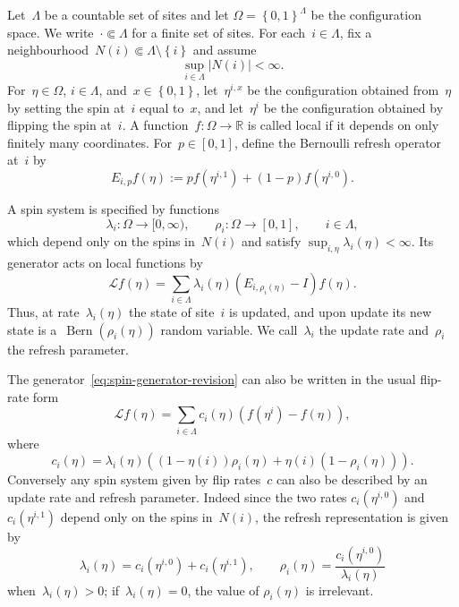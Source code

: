 \documentclass[EJP,preprint,NODS,nobera]{ejpecp}
\newcommand{\R}{\mathbb{R}}
\newcommand{\bb}[1]{\left(#1\right)}
\newcommand{\cb}[1]{\left\{#1\right\}}
\newcommand{\abs}[1]{\left|#1\right|}
\newcommand{\Lcal}{\mathcal{L}}
\begin{document}
Let~$\Lambda$ be a countable set of sites and let
$\Omega=\cb{0,1}^{\Lambda}$ be the configuration space. We write~$\cdot \Subset \Lambda$ for a finite set of sites. For each~$i\in\Lambda$,
fix a  neighbourhood~$N(i)\Subset\Lambda\setminus\cb{i}$ and assume
\begin{equation*}
\sup_{i\in\Lambda}\abs{N(i)}<\infty.
\end{equation*}
For~$\eta\in\Omega$, $i\in\Lambda$, and~$x\in\cb{0,1}$,
let~$\eta^{i,x}$ be the configuration obtained from~$\eta$ by setting the spin
at~$i$ equal to~$x$, and let~$\eta^i$ be the configuration obtained by flipping
the spin at~$i$. A function~$f:\Omega\to\R$ is called local if it depends on only finitely many
coordinates. For~$p\in[0,1]$, define the Bernoulli refresh operator at~$i$ by
\begin{equation*}
E_{i,p}f(\eta)
:=
pf(\eta^{i,1})+(1-p)f(\eta^{i,0}).
\end{equation*}

\begin{definition}
A spin system is specified by functions
\begin{equation*}
\lambda_i:\Omega\to[0,\infty),
\qquad
\rho_i:\Omega\to[0,1],
\qquad i\in\Lambda,
\end{equation*}
which depend only on the spins in~$N(i)$ and satisfy
$\sup_{i,\eta}\lambda_i(\eta)<\infty$. Its generator acts on local functions
by
\begin{equation}
\label{eq:spin-generator-revision}
\Lcal f(\eta)
=
\sum_{i\in\Lambda}
\lambda_i(\eta)
\bb{E_{i,\rho_i(\eta)}-I}f(\eta).
\end{equation}
Thus, at rate~$\lambda_i(\eta)$ the state of site~$i$ is updated, and upon update its new state is a~$\operatorname{Bern}(\rho_i(\eta))$ random variable. We call~$\lambda_i$ the update rate and~$\rho_i$ the refresh parameter.
\end{definition}

\begin{remark}
The generator~\eqref{eq:spin-generator-revision} can also be written in the
usual flip-rate form
\begin{equation*}
\Lcal f(\eta)
=
\sum_{i\in\Lambda}
c_i(\eta)\bb{f(\eta^i)-f(\eta)},
\end{equation*}
where
\begin{equation*}
c_i(\eta)
=
\lambda_i(\eta)
\bb{
\bb{1-\eta(i)}\rho_i(\eta)
+
\eta(i)\bb{1-\rho_i(\eta)}
}.
\end{equation*}
Conversely any spin system given by flip rates~$c$ can also be described by an update rate and refresh parameter. Indeed since the two rates
$c_i(\eta^{i,0})$ and~$c_i(\eta^{i,1})$ depend only on the spins in~$N(i)$, the refresh representation is given by
\begin{equation*}
\lambda_i(\eta)
=
c_i(\eta^{i,0})+c_i(\eta^{i,1}),
\qquad
\rho_i(\eta)
=
\frac{c_i(\eta^{i,0})}{\lambda_i(\eta)}
\end{equation*}
when~$\lambda_i(\eta)>0$; if~$\lambda_i(\eta)=0$, the value of
$\rho_i(\eta)$ is irrelevant. 
\end{remark}
\end{document}
